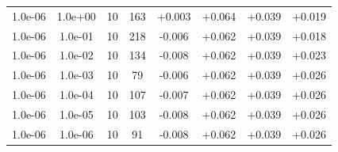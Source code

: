 \documentclass[11pt,a4paper]{article}
\begin{document}
\begin{table}
{\begin{tabular}{*{8}c}
 1.0e-06 	 & 1.0e+00 	 & 10 & 163 	 & +0.003 & +0.064 & +0.039 & +0.019 \\ 
 1.0e-06 	 & 1.0e-01 	 & 10 & 218 	 & -0.006 & +0.062 & +0.039 & +0.018 \\ 
 1.0e-06 	 & 1.0e-02 	 & 10 & 134 	 & -0.008 & +0.062 & +0.039 & +0.023 \\ 
 1.0e-06 	 & 1.0e-03 	 & 10 & 79 	 & -0.006 & +0.062 & +0.039 & +0.026 \\ 
 1.0e-06 	 & 1.0e-04 	 & 10 & 107 	 & -0.007 & +0.062 & +0.039 & +0.026 \\ 
 1.0e-06 	 & 1.0e-05 	 & 10 & 103 	 & -0.008 & +0.062 & +0.039 & +0.026 \\ 
 1.0e-06 	 & 1.0e-06 	 & 10 & 91 	 & -0.008 & +0.062 & +0.039 & +0.026 \\  
\end{tabular}}
\label{Tab::1}
\end{table} 






\begin{table}
\centering
\caption{ tau = double  }
\label{Tab::2}
\end{table} 



\begin{table}
\centering
\caption{ tau = double  }
\label{Tab::2}
\end{table} 
\end{document}
